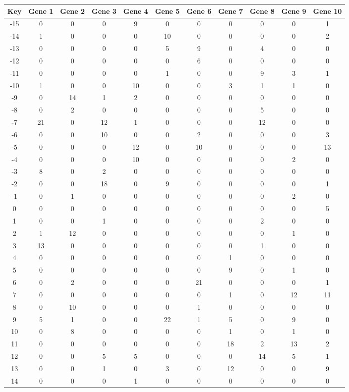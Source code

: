 \begin{tabular}{|c|c|c|c|c|c|c|c|c|c|c|}
\hline
Key & Gene 1 & Gene 2 & Gene 3 & Gene 4 & Gene 5 & Gene 6 & Gene 7 & Gene 8 & Gene 9 & Gene 10 \\
\hline
-15 & 0 & 0 & 0 & 9 & 0 & 0 & 0 & 0 & 0 & 1 \\
-14 & 1 & 0 & 0 & 0 & 10 & 0 & 0 & 0 & 0 & 2 \\
-13 & 0 & 0 & 0 & 0 & 5 & 9 & 0 & 4 & 0 & 0 \\
-12 & 0 & 0 & 0 & 0 & 0 & 6 & 0 & 0 & 0 & 0 \\
-11 & 0 & 0 & 0 & 0 & 1 & 0 & 0 & 9 & 3 & 1 \\
-10 & 1 & 0 & 0 & 10 & 0 & 0 & 3 & 1 & 1 & 0 \\
-9 & 0 & 14 & 1 & 2 & 0 & 0 & 0 & 0 & 0 & 0 \\
-8 & 0 & 2 & 0 & 0 & 0 & 0 & 0 & 5 & 0 & 0 \\
-7 & 21 & 0 & 12 & 1 & 0 & 0 & 0 & 12 & 0 & 0 \\
-6 & 0 & 0 & 10 & 0 & 0 & 2 & 0 & 0 & 0 & 3 \\
-5 & 0 & 0 & 0 & 12 & 0 & 10 & 0 & 0 & 0 & 13 \\
-4 & 0 & 0 & 0 & 10 & 0 & 0 & 0 & 0 & 2 & 0 \\
-3 & 8 & 0 & 2 & 0 & 0 & 0 & 0 & 0 & 0 & 0 \\
-2 & 0 & 0 & 18 & 0 & 9 & 0 & 0 & 0 & 0 & 1 \\
-1 & 0 & 1 & 0 & 0 & 0 & 0 & 0 & 0 & 2 & 0 \\
0 & 0 & 0 & 0 & 0 & 0 & 0 & 0 & 0 & 0 & 5 \\
1 & 0 & 0 & 1 & 0 & 0 & 0 & 0 & 2 & 0 & 0 \\
2 & 1 & 12 & 0 & 0 & 0 & 0 & 0 & 0 & 1 & 0 \\
3 & 13 & 0 & 0 & 0 & 0 & 0 & 0 & 1 & 0 & 0 \\
4 & 0 & 0 & 0 & 0 & 0 & 0 & 1 & 0 & 0 & 0 \\
5 & 0 & 0 & 0 & 0 & 0 & 0 & 9 & 0 & 1 & 0 \\
6 & 0 & 2 & 0 & 0 & 0 & 21 & 0 & 0 & 0 & 1 \\
7 & 0 & 0 & 0 & 0 & 0 & 0 & 1 & 0 & 12 & 11 \\
8 & 0 & 10 & 0 & 0 & 0 & 1 & 0 & 0 & 0 & 0 \\
9 & 5 & 1 & 0 & 0 & 22 & 1 & 5 & 0 & 9 & 0 \\
10 & 0 & 8 & 0 & 0 & 0 & 0 & 1 & 0 & 1 & 0 \\
11 & 0 & 0 & 0 & 0 & 0 & 0 & 18 & 2 & 13 & 2 \\
12 & 0 & 0 & 5 & 5 & 0 & 0 & 0 & 14 & 5 & 1 \\
13 & 0 & 0 & 1 & 0 & 3 & 0 & 12 & 0 & 0 & 9 \\
14 & 0 & 0 & 0 & 1 & 0 & 0 & 0 & 0 & 0 & 0 \\
\hline
\end{tabular}